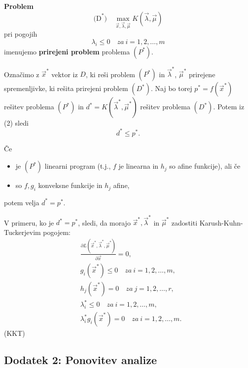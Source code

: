 \documentclass{article}
\begin{document}
\begin{multicols}{2}
	\textbf{Problem}
	\[
		\text{(D}^*\text{)} \quad \max_{\vec{x},\vec{\lambda}, \vec{\mu}} K(\vec{\lambda}, \vec{\mu})
	\]
	pri pogojih
	\[
		\lambda_i \leq 0 \quad za \ i = 1,2,\ldots,m
	\]
	imenujemo \textbf{prirejeni problem} problema \( (P^*) \).

	Označimo z \( \vec{x}^* \) vektor iz \( D \), ki reši problem \( (P^*) \) in \( \vec{\lambda}^* \), \( \vec{\mu}^* \) prirejene spremenljivke, ki rešita prirejeni problem \( (D^*) \). Naj bo torej \( p^* = f(\vec{x}^*) \) rešitev problema \( (P^*) \) in \( d^* = K(\vec{\lambda}^*, \vec{\mu}^*) \) rešitev problema \( (D^*) \). Potem iz (2) sledi
	\[
		d^* \leq p^*.
	\]

	Če
	\begin{itemize}
		\item je \( (P^*) \) linearni program (t.j., \( f \) je linearna in \( h_j \) so afine funkcije), ali če
		\item so \( f, g_i \) konveksne funkcije in \( h_j \) afine,
	\end{itemize}
	potem velja \( d^* = p^* \).

	V primeru, ko je \( d^* = p^* \), sledi, da morajo \( \vec{x}^*, \vec{\lambda}^* \) in \( \vec{\mu}^* \) zadostiti Karush-Kuhn-Tuckerjevim pogojem:
	\[
		\begin{aligned}
			 & \frac{\partial L(\vec{x}^*, \vec{\lambda}^*, \vec{\mu}^*)}{\partial \vec{x}} = 0, \\
			 & g_i(\vec{x}^*) \leq 0 \quad za \ i = 1,2,\ldots,m,                                \\
			 & h_j(\vec{x}^*) = 0 \quad za \ j = 1,2,\ldots,r,                                   \\
			 & \lambda_i^* \leq 0 \quad za \ i = 1,2,\ldots,m,                                   \\
			 & \lambda_i^* g_i(\vec{x}^*) = 0 \quad za \ i = 1,2,\ldots,m.
		\end{aligned}
	\]
	(KKT)



	\subsection{Dodatek 2: Ponovitev analize}

	

\end{multicols}
\end{document}
